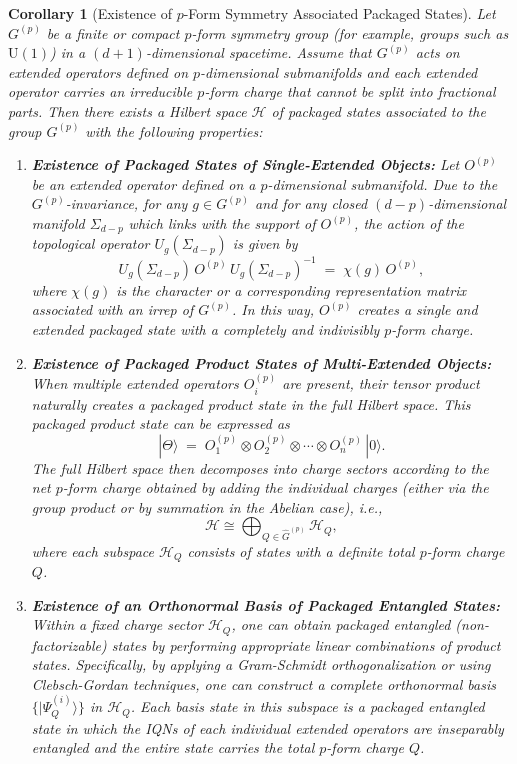 \documentclass[12pt,a4paper]{article}
\newtheorem{corollary}{Corollary}
\begin{document}
\begin{corollary}[Existence of $p$-Form Symmetry Associated Packaged States]
	Let $G^{(p)}$ be a finite or compact $p$-form symmetry group (for example, groups such as $\mathrm{U}(1)$) in a $(d+1)$-dimensional spacetime.
	Assume that $G^{(p)}$ acts on extended operators defined on $p$-dimensional submanifolds and each extended operator carries an irreducible $p$-form charge that cannot be split into fractional parts.
	Then there exists a Hilbert space $\mathcal{H}$ of packaged states associated to the group $G^{(p)}$ with the following properties:
	\begin{enumerate}
		\item \textbf{Existence of Packaged States of Single-Extended Objects:}  
		Let $O^{(p)}$ be an extended operator defined on a $p$-dimensional submanifold. Due to the $G^{(p)}$-invariance, for any $g \in G^{(p)}$ and for any closed $(d-p)$-dimensional manifold $\Sigma_{d-p}$ which links with the support of $O^{(p)}$, the action of the topological operator $U_g(\Sigma_{d-p})$ is given by
		\[
		U_g(\Sigma_{d-p})\, O^{(p)}\, U_g(\Sigma_{d-p})^{-1} \;=\; \chi(g)\, O^{(p)},
		\]
		where $\chi(g)$ is the character or a corresponding representation matrix associated with an irrep of $G^{(p)}$.
		In this way, $O^{(p)}$ creates a single and extended packaged state with a completely and indivisibly $p$-form charge.
		
		\item \textbf{Existence of Packaged Product States of Multi-Extended Objects:}  
		When multiple extended operators $O^{(p)}_i$ are present, their tensor product naturally creates a packaged product state in the full Hilbert space.
		This packaged product state can be expressed as
		\[
		|\Theta\rangle \;=\; O^{(p)}_1 \otimes O^{(p)}_2 \otimes \cdots \otimes O^{(p)}_n\,|0\rangle.
		\]
		The full Hilbert space then decomposes into charge sectors according to the net $p$-form charge obtained by adding the individual charges (either via the group product or by summation in the Abelian case), i.e.,
		\begin{equation}\label{PFormHilbertSpaceDecomposition}
			\mathcal{H} \cong \bigoplus_{Q\in\hat{G}^{(p)}} \mathcal{H}_Q,
		\end{equation}
		where each subspace $\mathcal{H}_Q$ consists of states with a definite total $p$-form charge $Q$.
				
		\item \textbf{Existence of an Orthonormal Basis of Packaged Entangled States:}  
		Within a fixed charge sector $\mathcal{H}_Q$, one can obtain packaged entangled (non-factorizable) states by performing appropriate linear combinations of product states.
		Specifically, by applying a Gram-Schmidt orthogonalization or using Clebsch-Gordan techniques, one can construct a complete orthonormal basis $\{|\Psi_Q^{(i)}\rangle\}$ in $\mathcal{H}_Q$.
		Each basis state in this subspace is a packaged entangled state in which the IQNs of each individual extended operators are inseparably entangled and the entire state carries the total $p$-form charge $Q$.
		

\end{enumerate}
\end{corollary}
\end{document}
